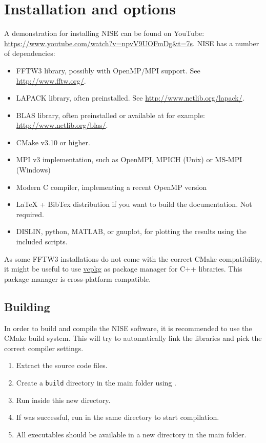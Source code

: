 \chapter{Installation and options}
A demonstration for installing NISE can be found on YouTube:
\url{https://www.youtube.com/watch?v=npvV9UOFmDg&t=7s}.
NISE has a number of dependencies:
\begin{itemize}
\item FFTW3 library, possibly with OpenMP/MPI support. See \url{http://www.fftw.org/}.
\item LAPACK library, often preinstalled. See \url{http://www.netlib.org/lapack/}.
\item BLAS library, often preinstalled or available at for example: \url{http://www.netlib.org/blas/}.
\item CMake v3.10 or higher.
\item MPI v3 implementation, such as OpenMPI, MPICH (Unix) or MS-MPI (Windows)
\item Modern C compiler, implementing a recent OpenMP version
\item LaTeX + BibTex distribution if you want to build the documentation. Not required.
\item DISLIN, python, MATLAB, or gnuplot, for plotting the results using the included scripts.
\end{itemize}
As some FFTW3 installations do not come with the correct CMake compatibility, it might
be useful to use \href{https://github.com/microsoft/vcpkg}{vcpkg} as package manager
for C++ libraries. This package manager is cross-platform compatible.

\section{Building}
In order to build and compile the NISE software, it is recommended to use the CMake
build system. This will try to automatically link the libraries and pick the correct
compiler settings.
\begin{enumerate}
\item Extract the source code files.
\item Create a \texttt{build} directory in the main folder using .
\item Run  inside this new  directory.
\item If  was successful, run  in the same directory to start compilation.
\item All executables should be available in a new  directory in the main folder.
\end{enumerate}

